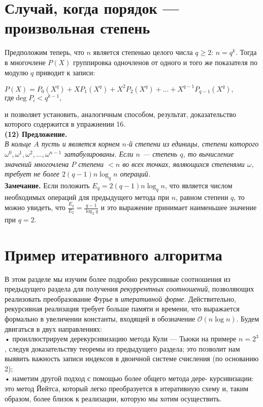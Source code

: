 \documentclass{mai_book}
\begin{document}
\section{ Случай, когда порядок — произвольная степень}
Предположим теперь, что $n$ является степенью целого числа $q \geq 2$:
$n=q^k$. Тогда в многочлене $P(X)$ группировка одночленов от одного и
того же показателя по модулю $q$ приводит к записи:\smallskip
\begin{center}
$P(X)=P_0(X^q)+XP_1(X^q)+X^2P_2(X^q)+...+X^{q-1}P_{q-1}(X^q),$
$ \text{где} \deg{P_i}<q^{k-1},$ 
\end{center}
и позволяет установить, аналогичным способом, результат, 
доказательство которого содержится в упражнении 16.\smallskip\\
\textbf{(12) Предложение.}\smallskip\\
\textit{В кольце $A$ пусть и является корнем $n$-й степени из единицы, степени
которого $\omega^0,\omega^1,\omega^2,...,\omega^{n-1}$ затабулированы. Если $n$ — степень $q$,
то вычисление значений многочлена $P$ степени $< n$ во всех точках,
являющихся степенями $\omega$, требует не более $2(q - 1)n \log_q n$ операций.}\\
\textbf{Замечание.} Если положить $E_q = 2(q - 1)n \log_q n$, что 
является числом необходимых операций для предыдущего метода при
$n$, равном степени $q$, то можно увидеть, что $\frac{E_q}{E_2}=\frac{q-1}{\log_2q}$ и это
выражение принимает наименьшее значение при $q = 2$.
\section{ Пример итеративного алгоритма}
В этом разделе мы изучим более подробно рекурсивные соотношения из
предыдущего раздела для получения \textit{рекуррентных соотношений}, 
позволяющих реализовать преобразование Фурье в \textit{итеративной форме}.
Действительно, рекурсивная реализация требует больше памяти и 
времени, что выражается формально в увеличении константы, входящей в
обозначение $\mathcal{O}(n \log n)$. Будем двигаться в двух направлениях:\\
• проиллюстрируем дерекурсивизацию метода Кули — Тьюки на
примере $n = 2^3$, следуя доказательству теоремы из предыдущего
раздела; это позволит нам выявить важность записи индексов в
двоичной системе счисления (по основанию 2);\\
• наметим другой подход с помощью более общего метода дере-
курсивизации: это метод Йейтса, который легко преобразуется в
итеративную схему и, таким образом, более близок к реализации,
которую мы хотим осуществить.
\end{document}
